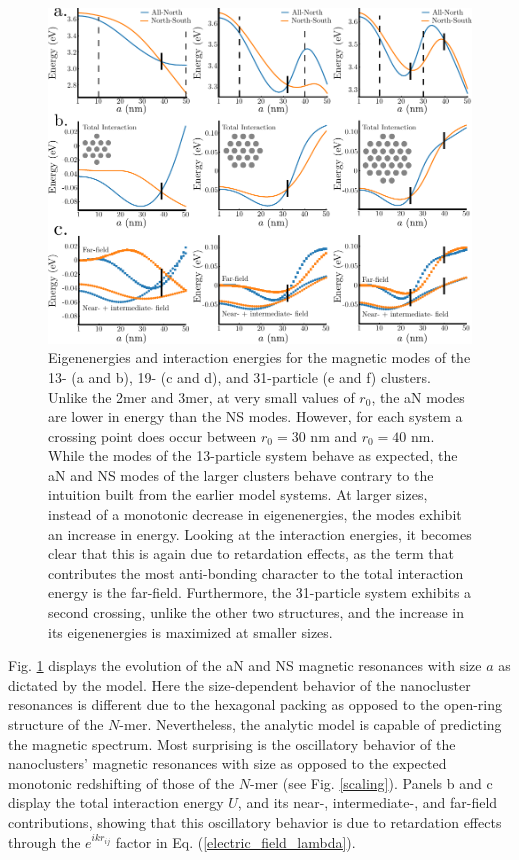 \documentclass[journal=apchd5,manuscript=article]{achemso}
\begin{document}
\begin{figure}
\includegraphics{fig6.pdf}
\caption{Eigenenergies and interaction energies for the magnetic modes of the 13- (a and b), 19- (c and d), and 31-particle (e and f) clusters. Unlike the 2mer and 3mer, at very small values of $r_0$, the aN modes are lower in energy than the NS modes. However, for each system a crossing point does occur between $r_0 = 30$ nm and $r_0 = 40$ nm. While the modes of the 13-particle system behave as expected, the aN and NS modes of the larger clusters behave contrary to the intuition built from the earlier model systems. At larger sizes, instead of a monotonic decrease in eigenenergies, the modes exhibit an increase in energy. Looking at the interaction energies, it becomes clear that this is again due to retardation effects, as the term that contributes the most anti-bonding character to the total interaction energy is the far-field. Furthermore, the 31-particle system exhibits a second crossing, unlike the other two structures, and the increase in its eigenenergies is maximized at smaller sizes.}
\label{kagan_eigen}
\end{figure}
Fig. \ref{kagan_eigen} displays the evolution of the aN and NS magnetic resonances with size $a$ as dictated by the model. Here the size-dependent behavior of the nanocluster resonances is different due to the hexagonal packing as opposed to the open-ring structure of the $N$-mer. Nevertheless, the analytic model is capable of predicting the magnetic spectrum. Most surprising is the oscillatory behavior of the nanoclusters' magnetic resonances with size as opposed to the expected monotonic redshifting of those of the $N$-mer (see Fig. \ref{scaling}). Panels b and c display the total interaction energy $U$, and its near-, intermediate-, and far-field contributions, showing that this oscillatory behavior is due to retardation effects through the $e^{ikr_{ij}}$ factor in Eq. (\ref{electric_field_lambda}). 
\end{document}
